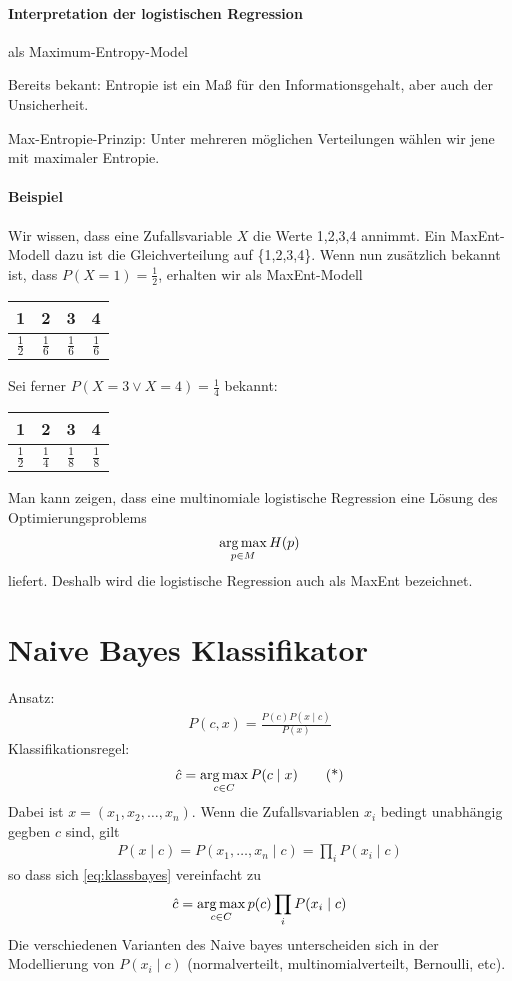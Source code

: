 \paragraph{Interpretation der logistischen Regression} als Maximum-Entropy-Model
\label{par:interpretation_der_logistischen_regression}

Bereits bekant: Entropie ist ein Maß für den Informationsgehalt, aber auch der
Unsicherheit.

Max-Entropie-Prinzip: Unter mehreren möglichen Verteilungen wählen wir jene mit
maximaler Entropie.

\begin{shaded}
\paragraph{Beispiel}
\label{par:beispielme}
Wir wissen, dass eine Zufallsvariable $X$ die Werte 1,2,3,4 annimmt.
Ein MaxEnt-Modell dazu ist die Gleichverteilung auf \{1,2,3,4\}.
Wenn nun zusätzlich bekannt ist, dass $P(X=1)=\frac{1}{2}$, erhalten wir als MaxEnt-Modell
\begin{tabular}[t]{cccc}
	1 & 2 & 3 & 4 \\\hline
	$\frac{1}{2}$ & $\frac{1}{6}$ & $\frac{1}{6}$ & $\frac{1}{6}$
\end{tabular}
Sei ferner $P(X=3 \lor X=4)=\frac{1}{4}$ bekannt:
\begin{tabular}[t]{cccc}
	1 & 2 & 3 & 4 \\\hline
		$\frac{1}{2}$ & $\frac{1}{4}$ & $\frac{1}{8}$ & $\frac{1}{8}$
\end{tabular}
\end{shaded}

Man kann zeigen, dass eine multinomiale logistische Regression eine Lösung des Optimierungsproblems
\begin{align*}
\operatorname*{arg\,max}_{p\in M} H(p)
\end{align*}
liefert.
Deshalb wird die logistische Regression auch als MaxEnt bezeichnet.


\section{Naive Bayes Klassifikator}
\label{sec:naive_bayes_klassifikator}
Ansatz:
\begin{align*}
    P(c,x)=\frac{P(c)P(x\mid c)}{P(x)}
\end{align*}
Klassifikationsregel:
\begin{align*}
    \hat c=\operatorname*{arg\,max}\limits_{c\in C} P(c\mid x) \tag{*}\label{eq:klassbayes}
\end{align*}
Dabei ist $x=(x_1,x_2,\dots,x_n)$.
Wenn die Zufallsvariablen $x_i$ bedingt unabhängig gegben \(c\) sind, gilt
\begin{align*}
    P(x\mid c)=P(x_1,\dots,x_n\mid c)=\prod_i P(x_i\mid c)
\end{align*}
so dass sich \cref{eq:klassbayes} vereinfacht zu
\begin{align*}
    \hat c= \operatorname*{arg\,max}_{c\in C}p(c)\prod_i P(x_i\mid c)
\end{align*}
Die verschiedenen Varianten des Naive bayes unterscheiden sich in der Modellierung von $P(x_i\mid c)$ (normalverteilt, multinomialverteilt, Bernoulli, etc).
